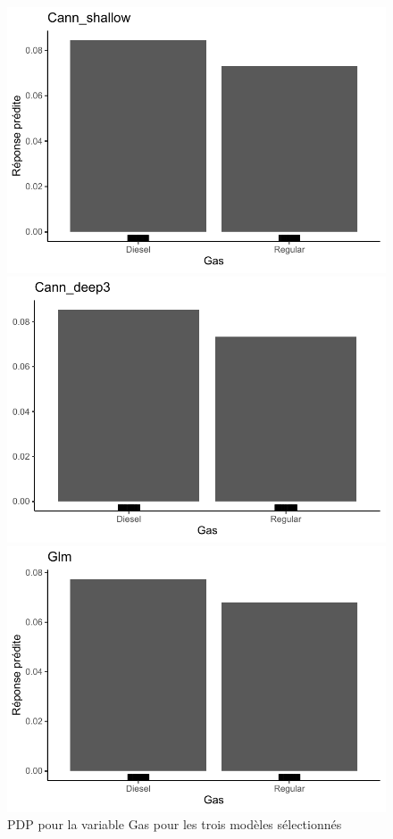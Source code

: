 \begin{figure}[b]
\caption{\label{fig:pdp3Gas} PDP pour la variable Gas pour les trois modèles sélectionnés}
\centering
\begin{minipage}{0.45\linewidth}
\includegraphics[scale=0.6]{Graphiques/pdpGasShallow}
\end{minipage}
\hfill
\begin{minipage}{0.45\linewidth}
\includegraphics[scale=0.6]{Graphiques/pdpGasCann}
\end{minipage}
\hfill
\begin{minipage}{0.45\linewidth}
\includegraphics[scale=0.6]{Graphiques/pdpGasGlm}

\end{minipage}
\end{figure}
